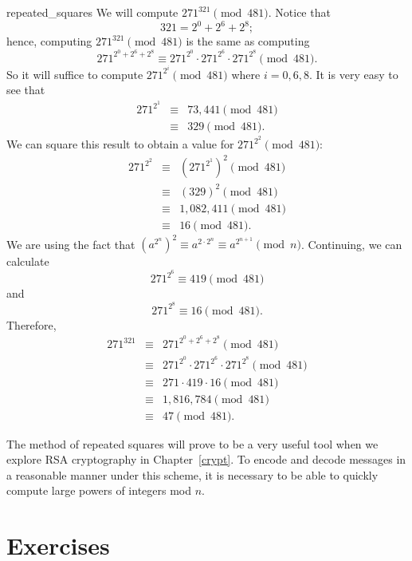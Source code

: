  
\begin{example}{repeated_squares}
We will compute $271^{321} \pmod{ 481}$. Notice that
\[
321 = 2^0 +2^6 + 2^8;
\]
hence, computing $271^{ 321} \pmod{ 481}$ is the same as computing
\[
271^{ 2^0 +2^6 + 2^8 } \equiv 271^{ 2^0 } \cdot 271^{
2^6 } \cdot 271^{ 2^8 } \pmod{ 481}.
\]
So it will suffice to compute $271^{ 2^i } \pmod{ 481}$ where $i = 0,
6, 8$. It is very easy to see that 
\begin{eqnarray*}
271^{ 2^1}  & \equiv & 73,441 \pmod{ 481}  \\
& \equiv & 329 \pmod{ 481}.
\end{eqnarray*}
We can square this result to obtain a value for $271^{ 2^2} \pmod{
481}$: 
\begin{eqnarray*}
271^{ 2^2}  & \equiv & (271^{ 2^1})^2 \pmod{ 481}
\\ & \equiv & (329)^2 \pmod{ 481} \\
& \equiv & 1,082,411 \pmod{ 481} \\
& \equiv & 16 \pmod{ 481}.
\end{eqnarray*}
We are using the fact that $(a^{2^n})^2  \equiv a^{2 \cdot 2^n} \equiv
a^{ 2^{n+1} } \pmod{ n}$. Continuing, we can calculate
\[
271^{ 2^6 } \equiv 419 \pmod{ 481}
\]
and
\[
271^{ 2^8 }  \equiv 16 \pmod{ 481}.
\]
Therefore,
\begin{eqnarray*}
271^{ 321}
& \equiv & 271^{ 2^0 +2^6 + 2^8 } \pmod{ 481} \\
& \equiv & 271^{ 2^0 } \cdot 271^{ 2^6 } \cdot 271^{ 2^8 }
\pmod{ 481} \\
& \equiv & 271 \cdot 419 \cdot 16 \pmod{ 481} \\
& \equiv & 1,816,784 \pmod{ 481} \\
& \equiv & 47 \pmod{ 481}.
\end{eqnarray*}
\end{example}
 
 
The method of repeated squares will prove to be a very useful tool
when we explore  RSA cryptography  in Chapter~\ref{crypt}. To encode and decode
messages in a reasonable manner under this scheme, it is necessary to
be able to quickly compute large powers of integers mod $n$.
 
 
\section*{Exercises}
\exrule
 
 
 

